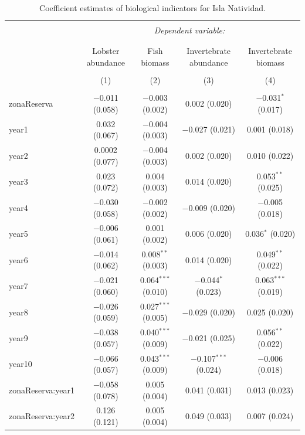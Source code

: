\documentclass[utf8]{frontiers_suppmat} %
\begin{document}
\begin{table}[!htbp] \centering 
  \caption{Coefficient estimates of biological indicators for Isla Natividad.} 
  \label{} 
\tiny 
\begin{tabular}{@{\extracolsep{1pt}}lcccc} 
\\[-1.8ex]\hline 
\hline \\[-1.8ex] 
 & \multicolumn{4}{c}{\textit{Dependent variable:}} \\ 
\cline{2-5} 
\\[-1.8ex] & \multicolumn{4}{c}{} \\ 
 & Lobster abundance & Fish biomass & Invertebrate abundance & Invertebrate biomass \\ 
\\[-1.8ex] & (1) & (2) & (3) & (4)\\ 
\hline \\[-1.8ex] 
 zonaReserva & $-$0.011 (0.058) & $-$0.003 (0.002) & 0.002 (0.020) & $-$0.031$^{*}$ (0.017) \\ 
  year1 & 0.032 (0.067) & $-$0.004 (0.003) & $-$0.027 (0.021) & 0.001 (0.018) \\ 
  year2 & 0.0002 (0.077) & $-$0.004 (0.003) & 0.002 (0.020) & 0.010 (0.022) \\ 
  year3 & 0.023 (0.072) & 0.004 (0.003) & 0.014 (0.020) & 0.053$^{**}$ (0.025) \\ 
  year4 & $-$0.030 (0.058) & $-$0.002 (0.002) & $-$0.009 (0.020) & $-$0.005 (0.018) \\ 
  year5 & $-$0.006 (0.061) & 0.001 (0.002) & 0.006 (0.020) & 0.036$^{*}$ (0.020) \\ 
  year6 & $-$0.014 (0.062) & 0.008$^{**}$ (0.003) & 0.014 (0.020) & 0.049$^{**}$ (0.022) \\ 
  year7 & $-$0.021 (0.060) & 0.064$^{***}$ (0.010) & $-$0.044$^{*}$ (0.023) & 0.063$^{***}$ (0.019) \\ 
  year8 & $-$0.026 (0.059) & 0.027$^{***}$ (0.005) & $-$0.029 (0.020) & 0.025 (0.020) \\ 
  year9 & $-$0.038 (0.057) & 0.040$^{***}$ (0.009) & $-$0.021 (0.025) & 0.056$^{**}$ (0.022) \\ 
  year10 & $-$0.066 (0.057) & 0.043$^{***}$ (0.009) & $-$0.107$^{***}$ (0.024) & $-$0.006 (0.018) \\ 
  zonaReserva:year1 & $-$0.058 (0.078) & 0.005 (0.004) & 0.041 (0.031) & 0.013 (0.023) \\ 
  zonaReserva:year2 & 0.126 (0.121) & 0.005 (0.004) & 0.049 (0.033) & 0.007 (0.024) \\ 

\end{tabular}
\end{table}
\end{document}
